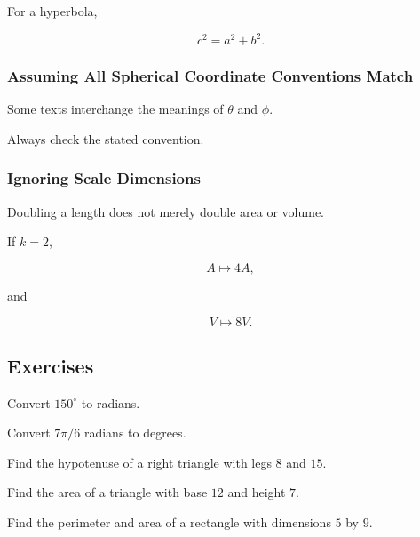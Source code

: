 For a hyperbola,

\[
\boxed{
c^2=a^2+b^2.
}
\]

\subsubsection{Assuming All Spherical Coordinate Conventions Match}

Some texts interchange the meanings of \(\theta\) and \(\phi\).

Always check the stated convention.

\subsubsection{Ignoring Scale Dimensions}

Doubling a length does not merely double area or volume.

If \(k=2\),

\[
\boxed{
A
\mapsto
4A,
}
\]

and

\[
\boxed{
V
\mapsto
8V.
}
\]

\subsection{Exercises}
\label{subsec:geometric-formulas-exercises}

\begin{exercise}[1]
Convert \(150^\circ\) to radians.
\end{exercise}

\begin{exercise}[1]
Convert \(7\pi/6\) radians to degrees.
\end{exercise}

\begin{exercise}[1]
Find the hypotenuse of a right triangle with legs \(8\) and \(15\).
\end{exercise}

\begin{exercise}[1]
Find the area of a triangle with base \(12\) and height \(7\).
\end{exercise}

\begin{exercise}[1]
Find the perimeter and area of a rectangle with dimensions \(5\) by \(9\).
\end{exercise}

